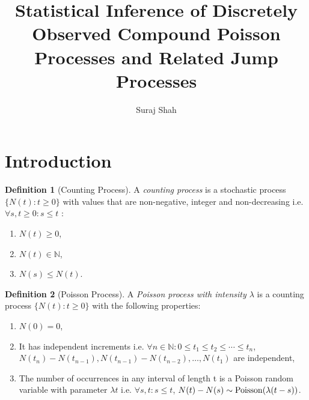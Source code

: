 \documentclass[a4paper,11pt]{article}
\title{Statistical Inference of Discretely Observed Compound Poisson Processes and Related Jump Processes}
\author{Suraj Shah}
\theoremstyle{theorem}
\theoremstyle{definition}
\newtheorem{defn}{Definition}[section]
\begin{document}
\maketitle

\begin{abstract}

\end{abstract}

\pagebreak

\tableofcontents

\pagebreak

\section{Introduction}

\begin{defn}[Counting Process]
A \textit{counting process} is a stochastic process $\{ N(t) : t \geq 0 \}$ with values that are non-negative, integer and non-decreasing i.e. $\forall s,t \geq 0 : s \leq t$ :

\begin{enumerate}

\item $N(t) \geq 0$,
\item $N(t)\in \mathbb{N}$,
\item $N(s) \leq N(t)$.

\end{enumerate}

\end{defn}

\begin{defn}[Poisson Process]
A \textit{Poisson process with intensity $\lambda$} is a counting process $\{ N(t) : t \geq 0 \}$ with the following properties:

\begin{enumerate}

\item $N(0) = 0$,
\item It has independent increments i.e. $\forall n \in \mathbb{N}: 0 \leq t_{1} \leq t_{2} \leq \dotsb \leq t_{n}$, $N(t_{n}) - N(t_{n-1}), N(t_{n-1}) - N(t_{n-2}), \dotsc , N(t_{1})$ are independent,
\item The number of occurrences in any interval of length t is a Poisson random variable with parameter $\lambda t$ i.e. $ \forall s,t : s \leq t$, $N(t) - N(s) \sim {\rm Poisson}(\lambda (t-s))$.

\end{enumerate}

\end{defn}
\end{document}
